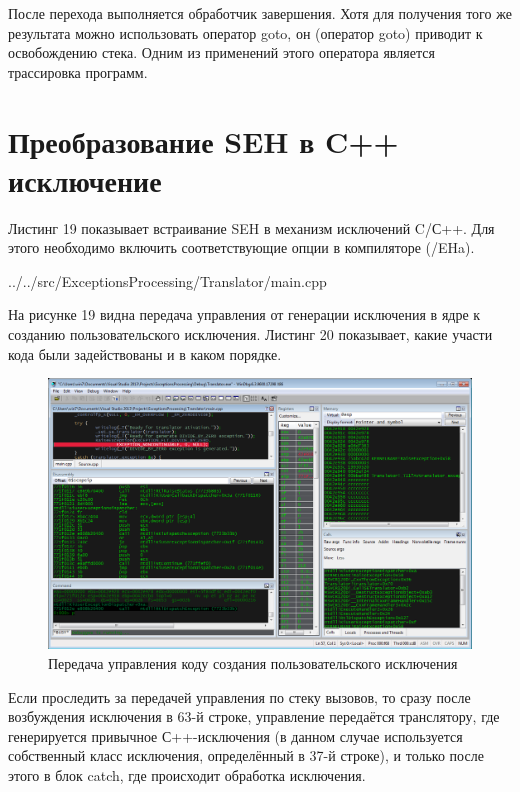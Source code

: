 \documentclass[a4paper, 12pt]{report}		%
\begin{document}
После перехода выполняется обработчик завершения. Хотя для получения того же результата можно использовать оператор goto, он (оператор goto) приводит к освобождению стека. Одним из применений этого оператора является трассировка программ.


\chapter*{Преобразование SEH в C++ исключение}

Листинг 19 показывает встраивание SEH в механизм исключений C/С++. Для этого необходимо включить соответствующие опции в компиляторе (/EHa).


{../../src/ExceptionsProcessing/Translator/main.cpp}

На рисунке 19 видна передача управления от генерации исключения в ядре к созданию пользовательского исключения. Листинг 20 показывает, какие участи кода были задействованы и в каком порядке.

\begin{figure}[h!]
\centering
\includegraphics[scale=0.50]{res/012}
\caption{Передача управления коду создания пользовательского исключения}
\end{figure}
\newpage



Если проследить за передачей управления по стеку вызовов, то сразу после возбуждения исключения в 63-й строке, управление передаётся транслятору, где генерируется привычное С++-исключения (в данном случае используется собственный класс исключения, определённый в 37-й строке), и только после этого в блок catch, где происходит обработка исключения.
\end{document}

